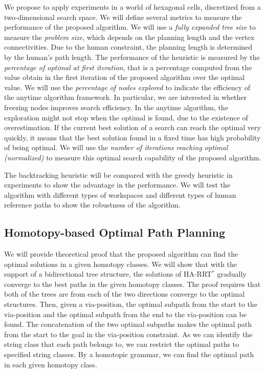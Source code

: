 \documentclass[phd]{byuprop}
\begin{document}
We propose to apply experiments in a world of hexagonal cells,  discretized from a two-dimensional search space.
We will define several metrics to measure the performance of the proposed algorithm.
We will use a \emph{fully expanded tree size} to measure the \emph{problem size}, which depends on the planning length and the vertex connectivities.
Due to the human constraint, the planning length is determined by the human's path length.
The performance of the heuristic is measured by the \emph{percentage of optimal at first iteration}, that is a percentage computed from the value obtain in the first iteration of the proposed algorithm over the optimal value.
We will use the \emph{percentage of nodes explored} to indicate the efficiency of the anytime algorithm framework.
In particular, we are interested in whether freezing nodes improves search efficiency.
In the anytime algorithm, the exploration might not stop when the optimal is found, due to the existence of overestimation.
If the current best solution of a search can reach the optimal very quickly, it means that the best solution found in a fixed time has high probability of being optimal.
We will use the \emph{number of iterations reaching optimal (normalized)} to measure this optimal search capability of the proposed algorithm.

The backtracking heuristic will be compared with the greedy heuristic in experiments to show the advantage in the performance.
We will test the algorithm with different types of workspaces and different types of human reference paths to show the robustness of the algorithm.


\subsection{Homotopy-based Optimal Path Planning}
\label{sec:validation:homotopy_based_optimal_path_planning}

We will provide theoretical proof that the proposed algorithm can find the optimal solutions in a given homotopy classes.
We will show that with the support of a bidirectional tree structure, the solutions of HA-RRT$^{*}$ gradually converge to the best paths in the given homotopy classes.
The proof requires that both of the trees are from each of the two directions converge to the optimal structures.
Then, given a via-position, the optimal subpath from the start to the via-position and the optimal subpath from the end to the via-position can be found.
The concatenation of the two optimal subpaths makes the optimal path from the start to the goal in the via-position constraint.
As we can identify the string class that each path belongs to, we can restrict the optimal paths to specified string classes.
By a homotopic grammar, we can find the optimal path in each given homotopy class.
\end{document}

